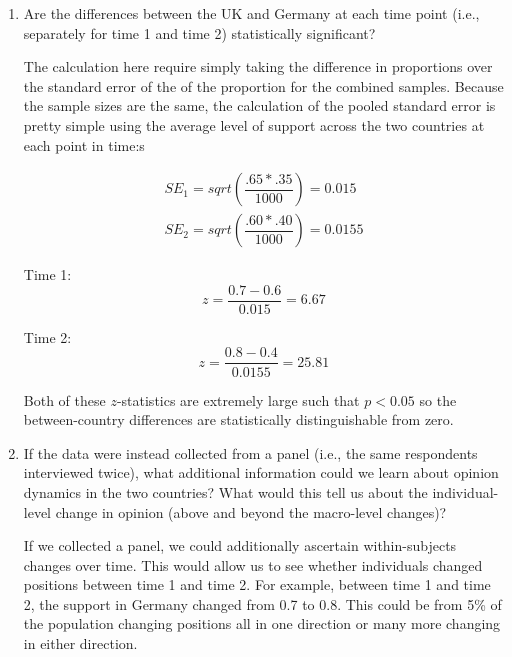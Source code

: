 \documentclass[a4paper]{exam}
\begin{document}
\begin{enumerate}
\begin{enumerate}
	\item Are the differences between the UK and Germany at each time point (i.e., separately for time 1 and time 2) statistically significant?
	
	\begin{solution}
	
	The calculation here require simply taking the difference in proportions over the standard error of the of the proportion for the combined samples. Because the sample sizes are the same, the calculation of the pooled standard error is pretty simple using the average level of support across the two countries at each point in time:s
	
	\begin{align*}
	SE_1 = sqrt(\dfrac{.65*.35}{1000}) = 0.015\\
	SE_2 = sqrt(\dfrac{.60*.40}{1000}) = 0.0155
	\end{align*}
	
	Time 1:
	\begin{equation}
	z = \dfrac{0.7 - 0.6}{0.015} = 6.67
	\end{equation}
	
	Time 2:
	\begin{equation}
	z = \dfrac{0.8 - 0.4}{0.0155} = 25.81
	\end{equation}
		
	Both of these $z$-statistics are extremely large such that $p<0.05$ so the between-country differences are statistically distinguishable from zero.
		
	\end{solution}
	
	\item If the data were instead collected from a panel (i.e., the same respondents interviewed twice), what additional information could we learn about opinion dynamics in the two countries? What would this tell us about the individual-level change in opinion (above and beyond the macro-level changes)?
	
	\begin{solution}
	
	If we collected a panel, we could additionally ascertain within-subjects changes over time. This would allow us to see whether individuals changed positions between time 1 and time 2. For example, between time 1 and time 2, the support in Germany changed from 0.7 to 0.8. This could be from 5\% of the population changing positions all in one direction or many more changing in either direction.
	

\end{solution}
\end{enumerate}
\end{enumerate}
\end{document}
